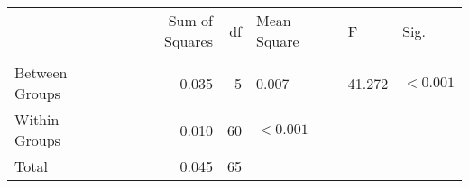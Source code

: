\begin{tabular}{lrrlll}
\toprule
 & Sum of Squares & df & Mean Square & F & Sig. \\
 &  &  &  &  &  \\
\midrule
Between Groups & 0.035 & 5 & 0.007 & 41.272 & $< 0.001$ \\
Within Groups & 0.010 & 60 & $< 0.001$ &  &  \\
Total & 0.045 & 65 &  &  &  \\
\bottomrule
\end{tabular}
